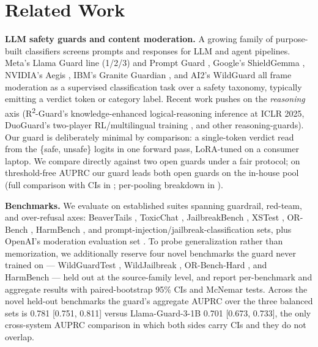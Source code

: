 \documentclass[sigconf,nonacm]{acmart}
\begin{document}
\section{Related Work}

\textbf{LLM safety guards and content moderation.} A growing family of purpose-built classifiers screens prompts and responses for LLM and agent pipelines. Meta's Llama Guard line (1/2/3) \cite{inan2023llamaguard,meta2024llamaguard2_3,fedorov2024llamaguard3_1b} and Prompt Guard \cite{meta2024promptguard}, Google's ShieldGemma \cite{zeng2024shieldgemma}, NVIDIA's Aegis \cite{ghosh2024aegis}, IBM's Granite Guardian \cite{padhi2024graniteguardian}, and AI2's WildGuard \cite{han2024wildguard} all frame moderation as a supervised classification task over a safety taxonomy, typically emitting a verdict token or category label. Recent work pushes on the \emph{reasoning} axis (R\textsuperscript{2}-Guard's knowledge-enhanced logical-reasoning inference \cite{kang2025r2guard} at ICLR 2025, DuoGuard's two-player RL/multilingual training \cite{deng2025duoguard}, and other reasoning-guards). Our guard is deliberately minimal by comparison: a single-token verdict read from the \{safe, unsafe\} logits in one forward pass, LoRA-tuned on a consumer laptop. We compare directly against two open guards under a fair protocol; on threshold-free AUPRC our guard leads both open guards on the in-house pool (full comparison with CIs in ; per-pooling breakdown in ).

\textbf{Benchmarks.} We evaluate on established suites spanning guardrail, red-team, and over-refusal axes: BeaverTails \cite{ji2023beavertails}, ToxicChat \cite{lin2023toxicchat}, JailbreakBench \cite{chao2024jailbreakbench}, XSTest \cite{rottger2024xstest}, OR-Bench \cite{cui2024orbench}, HarmBench \cite{mazeika2024harmbench}, and prompt-injection/jailbreak-classification sets, plus OpenAI's moderation evaluation set \cite{markov2023holistic}. To probe generalization rather than memorization, we additionally reserve four novel benchmarks the guard never trained on --- WildGuardTest \cite{han2024wildguard}, WildJailbreak \cite{jiang2024wildteaming}, OR-Bench-Hard \cite{cui2024orbench}, and HarmBench \cite{mazeika2024harmbench} --- held out at the source-family level, and report per-benchmark and aggregate results with paired-bootstrap 95\% CIs and McNemar tests. Across the novel held-out benchmarks the guard's aggregate AUPRC over the three balanced sets is 0.781 [0.751, 0.811] versus Llama-Guard-3-1B 0.701 [0.673, 0.733], the only cross-system AUPRC comparison in which both sides carry CIs and they do not overlap.
\end{document}
